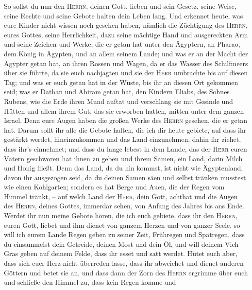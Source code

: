  So sollst du nun den \textsc{Herrn}, deinen Gott, lieben
und sein Gesetz, seine Weise, seine Rechte und seine Gebote halten dein
Leben lang.  Und erkennet heute, was eure Kinder nicht
wissen noch gesehen haben, nämlich die Züchtigung des \textsc{Herrn},
eures Gottes, seine Herrlichkeit, dazu seine mächtige Hand und
ausgereckten Arm  und seine Zeichen und Werke, die er
getan hat unter den Ägyptern, an Pharao, dem König in Ägypten, und an
allem seinem Lande;  und was er an der Macht der Ägypter
getan hat, an ihren Rossen und Wagen, da er das Wasser des Schilfmeers
über sie führte, da sie euch nachjagten und sie der \textsc{Herr}
umbrachte bis auf diesen Tag;  und was er euch getan hat
in der Wüste, bis ihr an diesen Ort gekommen seid;  was er
Dathan und Abiram getan hat, den Kindern Eliabs, des Sohnes Rubens, wie
die Erde ihren Mund auftat und verschlang sie mit Gesinde und Hütten und
allem ihrem Gut, das sie erworben hatten, mitten unter dem ganzen
Israel.  Denn eure Augen haben die großen Werke des
\textsc{Herrn} gesehen, die er getan hat.  Darum sollt ihr
alle die Gebote halten, die ich dir heute gebiete, auf dass ihr gestärkt
werdet, hineinzukommen und das Land einzunehmen, dahin ihr ziehet, dass
ihr's einnehmet;  und dass du lange lebest in dem Lande,
das der \textsc{Herr} euren Vätern geschworen hat ihnen zu geben und
ihrem Samen, ein Land, darin Milch und Honig fließt. 
Denn das Land, da du hin kommst, ist nicht wie Ägyptenland, davon ihr
ausgezogen seid, da du deinen Samen säen und selbst tränken musstest wie
einen Kohlgarten;  sondern es hat Berge und Auen, die der
Regen vom Himmel tränkt, --  auf welch Land der
\textsc{Herr}, dein Gott, achthat und die Augen des \textsc{Herrn},
deines Gottes, immerdar sehen, von Anfang des Jahres bis ans Ende.
 Werdet ihr nun meine Gebote hören, die ich euch gebiete,
dass ihr den \textsc{Herrn}, euren Gott, liebet und ihm dienet von
ganzem Herzen und von ganzer Seele,  so will ich eurem
Lande Regen geben zu seiner Zeit, Frühregen und Spätregen, dass du
einsammelst dein Getreide, deinen Most und dein Öl,  und
will deinem Vieh Gras geben auf deinem Felde, dass ihr esset und satt
werdet.  Hütet euch aber, dass sich euer Herz nicht
überreden lasse, dass ihr abweichet und dienet anderen Göttern und betet
sie an,  und dass dann der Zorn des \textsc{Herrn}
ergrimme über euch und schließe den Himmel zu, dass kein Regen komme und
